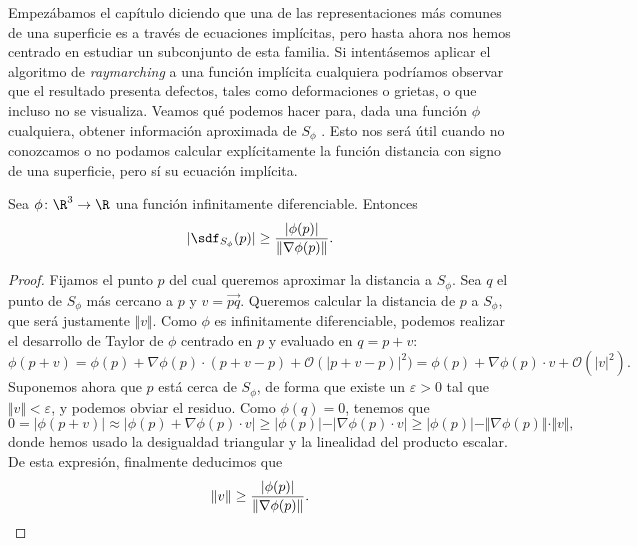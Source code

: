 Empezábamos el capítulo diciendo que una de las representaciones más comunes de una superficie es a través de ecuaciones implícitas, pero hasta ahora nos hemos centrado en estudiar un subconjunto de esta familia. Si intentásemos aplicar el algoritmo de \textit{raymarching} a una función implícita cualquiera podríamos observar que el resultado presenta defectos, tales como deformaciones o grietas, o que incluso no se visualiza. Veamos qué podemos hacer para, dada una función $\phi$ cualquiera, obtener información aproximada de $S_\phi$ \cite{article:aprox}. Esto nos será útil cuando no conozcamos o no podamos calcular explícitamente la función distancia con signo de una superficie, pero sí su ecuación implícita.

\begin{proposicion}\label{p:aproxImp}
    Sea $\phi\colon \R^3\to\R$ una función infinitamente diferenciable. Entonces
    \begin{equation*}    
        \vert \sdf_{S_\phi}(p)\vert \ge \frac{\vert \phi(p)\vert}{\Vert \nabla\phi(p)\Vert}.
    \end{equation*}
\end{proposicion}
\begin{proof}
    Fijamos el punto $p$ del cual queremos aproximar la distancia a $S_{\phi}$. Sea $q$ el punto de $S_\phi$ más cercano a $p$ y $v=\vec{pq}$. Queremos calcular la distancia de $p$ a $S_\phi$, que será justamente $\Vert v\Vert$. Como $\phi$ es infinitamente diferenciable, podemos realizar el desarrollo de Taylor de $\phi$ centrado en $p$ y evaluado en $q=p+v$:
    \begin{equation*}
        \phi(p+v) = \phi(p) + \nabla\phi(p)\cdot (p+v -p) + \mathcal{O}(\vert p+v-p)\vert^2) = \phi(p) + \nabla\phi(p)\cdot v + \mathcal{O}(\vert v\vert^2).
    \end{equation*}
    Suponemos ahora que $p$ está cerca de $S_\phi$, de forma que existe un $\varepsilon>0$ tal que  $\Vert v\Vert < \varepsilon$, y podemos obviar el residuo. Como $\phi(q)=0$, tenemos que
    \begin{equation*}
        0 = \vert \phi(p+v)\vert \approx \vert \phi(p) + \nabla\phi(p)\cdot v \vert \ge \vert \phi(p)\vert - \vert \nabla\phi(p)\cdot v \vert \ge \vert \phi(p)\vert - \Vert \nabla\phi(p)\Vert\cdot \Vert v \Vert,
    \end{equation*}
    donde hemos usado la desigualdad triangular y la linealidad del producto escalar. De esta expresión, finalmente deducimos que
    \begin{equation*}
        \Vert v\Vert \ge \frac{\vert \phi(p)\vert}{\Vert \nabla\phi(p)\Vert}.\qedhere
    \end{equation*}
\end{proof}

